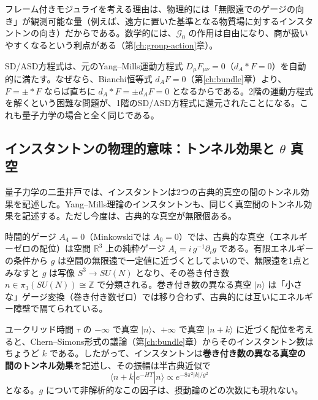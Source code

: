 \documentclass[uplatex, dvipdfmx, book]{jsbook}
\let\origsubsection\subsection
\let\origsubsubsection\subsubsection
\renewcommand{\section}{\origsubsection}
\renewcommand{\subsection}{\origsubsubsection}
\renewcommand{\subsubsection}{\paragraph}
\begin{document}
フレーム付きモジュライを考える理由は、物理的には「無限遠でのゲージの向き」が観測可能な量（例えば、遠方に置いた基準となる物質場に対するインスタントンの向き）だからである。数学的には、$\mathcal{G}_0$ の作用は自由になり、商が扱いやすくなるという利点がある（第\ref{ch:group-action}章）。

SD/ASD方程式は、元のYang--Mills運動方程式 $D_\mu F_{\mu\nu} = 0$（$d_A *F = 0$）を自動的に満たす。なぜなら、Bianchi恒等式 $d_A F = 0$（第\ref{ch:bundle}章）より、$F = \pm *F$ ならば直ちに $d_A *F = \pm d_A F = 0$ となるからである。2階の運動方程式を解くという困難な問題が、1階のSD/ASD方程式に還元されたことになる。これも量子力学の場合と全く同じである。

\section{インスタントンの物理的意味：トンネル効果と $\theta$ 真空}
\label{sec:theta}

量子力学の二重井戸では、インスタントンは2つの古典的真空の間のトンネル効果を記述した。Yang--Mills理論のインスタントンも、同じく真空間のトンネル効果を記述する。ただし今度は、古典的な真空が無限個ある。

時間的ゲージ $A_4 = 0$（Minkowskiでは $A_0 = 0$）では、古典的な真空（エネルギーゼロの配位）は空間 $\mathbb{R}^3$ 上の純粋ゲージ $A_i = i\, g^{-1}\partial_i g$ である。有限エネルギーの条件から $g$ は空間の無限遠で一定値に近づくとしてよいので、無限遠を1点とみなすと $g$ は写像 $S^3 \to SU(N)$ となり、その巻き付き数 $n \in \pi_3(SU(N)) \cong \mathbb{Z}$ で分類される。巻き付き数の異なる真空 $|n\rangle$ は「小さな」ゲージ変換（巻き付き数ゼロ）では移り合わず、古典的には互いにエネルギー障壁で隔てられている。

ユークリッド時間 $\tau$ の $-\infty$ で真空 $|n\rangle$、$+\infty$ で真空 $|n + k\rangle$ に近づく配位を考えると、Chern--Simons形式の議論（第\ref{ch:bundle}章）からそのインスタントン数はちょうど $k$ である。したがって、インスタントンは\textbf{巻き付き数の異なる真空の間のトンネル効果}を記述し、その振幅は半古典近似で
\begin{equation}
    \langle n + k | e^{-HT} | n \rangle \propto e^{-8\pi^2 |k|/g^2}
\end{equation}
となる。$g$ について非解析的なこの因子は、摂動論のどの次数にも現れない。
\end{document}
